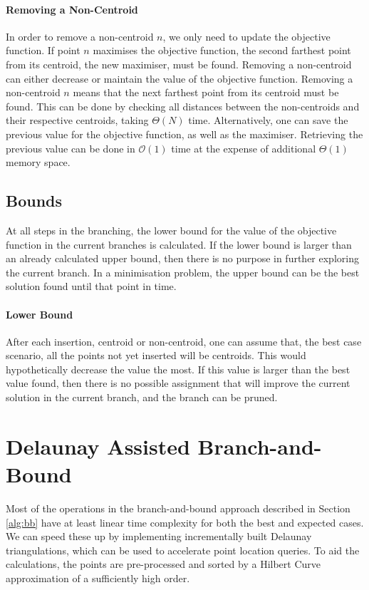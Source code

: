 \paragraph{Removing a Non-Centroid}
In order to remove a non-centroid $n$, we only need to update the objective function. If point $n$ maximises the objective function, the second farthest point from its centroid, the new maximiser, must be found.
Removing a non-centroid can either decrease or maintain the value of the objective function.
Removing a non-centroid $n$ means that the next farthest point from its centroid must be found. This can be done by checking all distances between the non-centroids and their respective centroids, taking $\Theta(N)$ time. Alternatively, one can save the previous value for the objective function, as well as the maximiser. Retrieving the previous value can be done in $\mathcal{O}(1)$ time at the expense of additional $\Theta(1)$ memory space.
\subsection{Bounds}
\label{sec:bounds}
At all steps in the branching, the lower bound for the value of the objective function in the current branches is calculated. If the lower bound is larger than an already calculated upper bound, then there is no purpose in further exploring the current branch. In a minimisation problem, the upper bound can be the best solution found until that point in time.

\paragraph{Lower Bound}
After each insertion, centroid or non-centroid, one can assume that, the best case scenario, all the points not yet inserted will be centroids. This would hypothetically decrease the value the most. If this value is larger than the best value found, then there is no possible assignment that will improve the current solution in the current branch, and the branch can be pruned.
\section{Delaunay Assisted Branch-and-Bound}
\label{alg:da}

Most of the operations in the branch-and-bound approach described in Section \ref{alg:bb} have at least linear time complexity for both the best and expected cases. We can speed these up by implementing incrementally built Delaunay triangulations, which can be used to accelerate point location queries. To aid the calculations, the points are pre-processed and sorted by a Hilbert Curve approximation of a sufficiently high order.

